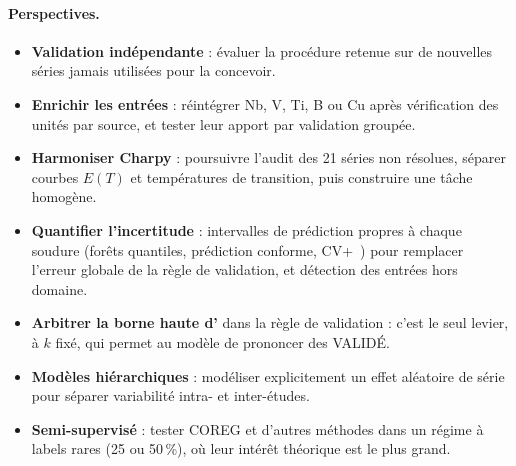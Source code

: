 \paragraph{Perspectives.}
\begin{itemize}
  \item \textbf{Validation indépendante} : évaluer la procédure retenue sur de nouvelles séries jamais utilisées pour la concevoir.
  \item \textbf{Enrichir les entrées} : réintégrer Nb, V, Ti, B ou Cu après vérification des unités par source, et tester leur apport par validation groupée.
  \item \textbf{Harmoniser Charpy} : poursuivre l'audit des 21 séries non résolues, séparer courbes $E(T)$ et températures de transition, puis construire une tâche homogène.
  \item \textbf{Quantifier l'incertitude} : intervalles de prédiction propres à chaque soudure (forêts quantiles, prédiction conforme, CV+~\cite{barber_2021}) pour remplacer l'erreur globale de la règle de validation, et détection des entrées hors domaine.
  \item \textbf{Arbitrer la borne haute d'\UTS} dans la règle de validation : c'est le seul levier, à $k$ fixé, qui permet au modèle de prononcer des VALIDÉ.
  \item \textbf{Modèles hiérarchiques} : modéliser explicitement un effet aléatoire de série pour séparer variabilité intra- et inter-études.
  \item \textbf{Semi-supervisé} : tester COREG et d'autres méthodes dans un régime à labels rares (25 ou 50\,\%), où leur intérêt théorique est le plus grand.
\end{itemize}
